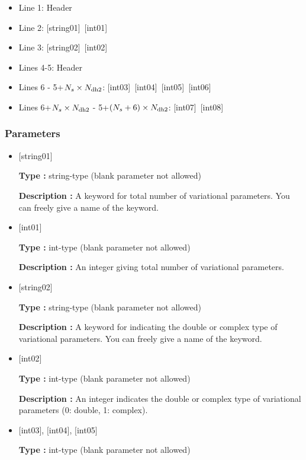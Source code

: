  \begin{itemize}
   \item  Line 1: Header
   \item  Line 2: [string01]~[int01]
   \item  Line 3: [string02]~[int02]
   \item  Lines 4-5:  Header
   \item  Lines 6 - 5+$N_s\times N_{\rm dh2}$: [int03]~[int04]~[int05]~[int06]
   \item  Lines 6+$N_s\times N_{\rm dh2}$ - 5+$(N_s+6) \times N_{\rm dh2}$: [int07]~[int08]
  \end{itemize}
\subsubsection{Parameters}
 \begin{itemize}

   \item  $[$string01$]$
   
    {\bf Type :} string-type (blank parameter not allowed)

   {\bf Description :} A keyword for total number of variational parameters. You can freely give a name of the keyword. 

   \item  $[$int01$]$
   
    {\bf Type :} int-type (blank parameter not allowed)

   {\bf Description :} An integer giving total number of variational parameters. 

  \item  $[$string02$]$
   
    {\bf Type :} string-type (blank parameter not allowed)

   {\bf Description :}  A keyword for indicating the double or complex type of variational parameters. You can freely give a name of the keyword.
   
   \item  $[$int02$]$
   
    {\bf Type :} int-type (blank parameter not allowed)

   {\bf Description :} An integer indicates the double or complex type of variational parameters (0: double, 1: complex). 

  \item  $[$int03$]$,  $[$int04$]$, $[$int05$]$
   
 {\bf Type :} int-type (blank parameter not allowed)


\end{itemize}
